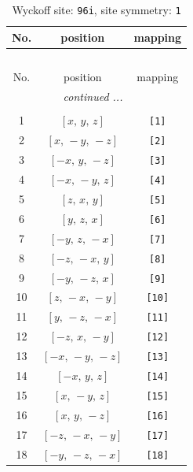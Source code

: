 \documentclass[fleqn,8pt]{jsarticle}
\begin{document}
\begin{longtable}{ccc}
\caption{Wyckoff site: {\tt 96i}, site symmetry: {\tt 1}}
 \\
 \hline \hline
No. & position & mapping \\ \hline \endfirsthead

\multicolumn{2}{l}{\tablename\ \thetable{}} \\
 \hline \hline
No. & position & mapping \\ \hline \endhead

 \hline \hline
\multicolumn{2}{r}{\footnotesize\it continued ...} \\ \endfoot

 \hline \hline
\multicolumn{2}{r}{} \\ \endlastfoot

1 & $\left[ x,\, y,\, z \right]$ & {\tt [1]} \\ \hline
2 & $\left[ x,\, - y,\, - z \right]$ & {\tt [2]} \\ \hline
3 & $\left[ - x,\, y,\, - z \right]$ & {\tt [3]} \\ \hline
4 & $\left[ - x,\, - y,\, z \right]$ & {\tt [4]} \\ \hline
5 & $\left[ z,\, x,\, y \right]$ & {\tt [5]} \\ \hline
6 & $\left[ y,\, z,\, x \right]$ & {\tt [6]} \\ \hline
7 & $\left[ - y,\, z,\, - x \right]$ & {\tt [7]} \\ \hline
8 & $\left[ - z,\, - x,\, y \right]$ & {\tt [8]} \\ \hline
9 & $\left[ - y,\, - z,\, x \right]$ & {\tt [9]} \\ \hline
10 & $\left[ z,\, - x,\, - y \right]$ & {\tt [10]} \\ \hline
11 & $\left[ y,\, - z,\, - x \right]$ & {\tt [11]} \\ \hline
12 & $\left[ - z,\, x,\, - y \right]$ & {\tt [12]} \\ \hline
13 & $\left[ - x,\, - y,\, - z \right]$ & {\tt [13]} \\ \hline
14 & $\left[ - x,\, y,\, z \right]$ & {\tt [14]} \\ \hline
15 & $\left[ x,\, - y,\, z \right]$ & {\tt [15]} \\ \hline
16 & $\left[ x,\, y,\, - z \right]$ & {\tt [16]} \\ \hline
17 & $\left[ - z,\, - x,\, - y \right]$ & {\tt [17]} \\ \hline
18 & $\left[ - y,\, - z,\, - x \right]$ & {\tt [18]} \\ \hline

\end{longtable}
\end{document}
